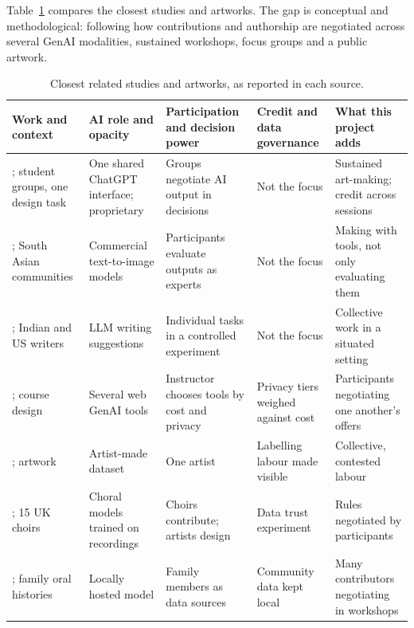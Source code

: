 Table~\ref{tab:related} compares the closest studies and artworks. The gap
is conceptual and methodological: following how contributions and
authorship are negotiated across several GenAI modalities, sustained
workshops, focus groups and a public artwork.

\begin{table}[ht]
\centering
\footnotesize
{}
\caption{Closest related studies and artworks, as reported in each source.}
\label{tab:related}
\begin{tabularx}{\linewidth}{@{}>{\raggedright\arraybackslash}p{2.9cm}
  >{\raggedright\arraybackslash}X
  >{\raggedright\arraybackslash}X
  >{\raggedright\arraybackslash}X
  >{\raggedright\arraybackslash}X@{}}
\toprule
Work and context & AI role and opacity & Participation and decision power & Credit and data governance & What this project adds \\
\midrule
\citet{xu2026}; student groups, one design task & One shared ChatGPT interface; proprietary & Groups negotiate AI output in decisions & Not the focus & Sustained art-making; credit across sessions \\
\citet{qadri2023}; South Asian communities & Commercial text-to-image models & Participants evaluate outputs as experts & Not the focus & Making with tools, not only evaluating them \\
\citet{agarwal2025}; Indian and US writers & LLM writing suggestions & Individual tasks in a controlled experiment & Not the focus & Collective work in a situated setting \\
\citet{caines2026steaming}; course design & Several web GenAI tools & Instructor chooses tools by cost and privacy & Privacy tiers weighed against cost & Participants negotiating one another's offers \\
\citet{ridler2018}; artwork & Artist-made dataset & One artist & Labelling labour made visible & Collective, contested labour \\
\citet{herndon2024call}; 15 UK choirs & Choral models trained on recordings & Choirs contribute; artists design & Data trust experiment & Rules negotiated by participants \\
\citet{dinkins_ntoo}; family oral histories & Locally hosted model & Family members as data sources & Community data kept local & Many contributors negotiating in workshops \\
\bottomrule
\end{tabularx}
\end{table}
